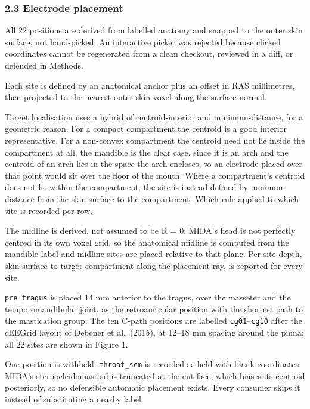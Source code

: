 \documentclass[
  11pt,
  a4paper,
]{article}
\begin{document}
\subsubsection{2.3 Electrode placement}\label{electrode-placement}

All 22 positions are derived from labelled anatomy and snapped to the outer skin
surface, not hand-picked. An interactive picker was rejected because clicked
coordinates cannot be regenerated from a clean checkout, reviewed in a diff, or
defended in Methods.

Each site is defined by an anatomical anchor plus an offset in RAS millimetres,
then projected to the nearest outer-skin voxel along the surface normal.

Target localisation uses a hybrid of centroid-interior and minimum-distance, for
a geometric reason. For a compact compartment the centroid is a good interior
representative. For a non-convex compartment the centroid need not lie inside
the compartment at all, the mandible is the clear case, since it is an arch and
the centroid of an arch lies in the space the arch encloses, so an electrode
placed over that point would sit over the floor of the mouth. Where a
compartment's centroid does not lie within the compartment, the site is instead
defined by minimum distance from the skin surface to the compartment. Which rule
applied to which site is recorded per row.

The midline is derived, not assumed to be R = 0: MIDA's head is not perfectly
centred in its own voxel grid, so the anatomical midline is computed from the
mandible label and midline sites are placed relative to that plane. Per-site
depth, skin surface to target compartment along the placement ray, is reported
for every site.

\texttt{pre\_tragus} is placed 14 mm anterior to the tragus, over the masseter and the
temporomandibular joint, as the retroauricular position with the shortest path
to the mastication group. The ten C-path positions are labelled \texttt{cg01}--\texttt{cg10}
after the cEEGrid layout of Debener et al.~(2015), at 12--18 mm spacing around
the pinna; all 22 sites are shown in Figure 1.

One position is withheld. \texttt{throat\_scm} is recorded as held with blank
coordinates: MIDA's sternocleidomastoid is truncated at the cut face, which
biases its centroid posteriorly, so no defensible automatic placement exists.
Every consumer skips it instead of substituting a nearby label.
\end{document}
